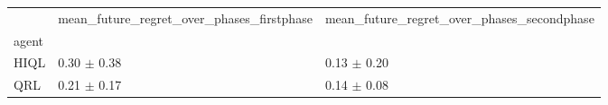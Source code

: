 \begin{tabular}{lll}
\toprule
 & mean_future_regret_over_phases_firstphase & mean_future_regret_over_phases_secondphase \\
agent &  &  \\
\midrule
HIQL & 0.30 $\pm$ 0.38 & 0.13 $\pm$ 0.20 \\
QRL & 0.21 $\pm$ 0.17 & 0.14 $\pm$ 0.08 \\
\bottomrule
\end{tabular}
